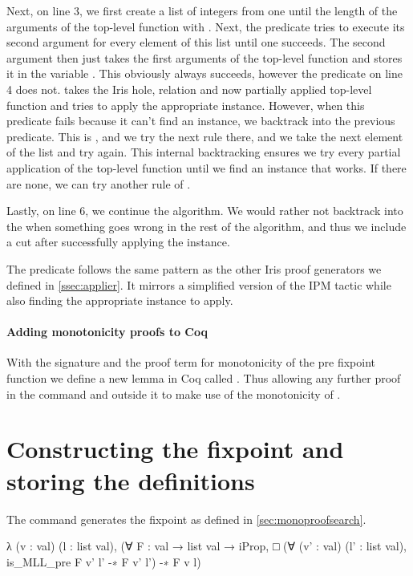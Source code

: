 \documentclass[thesis.tex]{subfiles}
\begin{document}
Next, on line 3, we first create a list of integers from one until the length of the arguments of the top-level function with . Next, the  predicate tries to execute its second argument for every element of this list until one succeeds. The second argument then just takes the first  arguments of the top-level function and stores it in the variable . This obviously always succeeds, however the predicate on line 4 does not.  takes the Iris hole, relation and now partially applied top-level function and tries to apply the appropriate  instance. However, when this predicate fails because it can't find an  instance, we backtrack into the previous predicate. This is , and we try the next rule there, and we take the next element of the list and try again. This internal backtracking ensures we try every partial application of the top-level function until we find an  instance that works. If there are none, we can try another rule of .

Lastly, on line 6, we continue the algorithm. We would rather not backtrack into the  when something goes wrong in the rest of the algorithm, and thus we include a cut after successfully applying the  instance.

The predicate  follows the same pattern as the other Iris proof generators we defined in \cref{ssec:applier}. It mirrors a simplified version of the IPM  tactic while also finding the appropriate  instance to apply.

\paragraph{Adding monotonicity proofs to Coq}
With the signature and the proof term for monotonicity of the pre fixpoint function we define a new lemma in Coq called . Thus allowing any further proof in the command and outside it to make use of the monotonicity of .

\section{Constructing the fixpoint and storing the definitions}\label{sec:constrfixpoint}
The command  generates the fixpoint as defined in \cref{sec:monoproofsearch}.
\begin{coqcode}
  λ (v : val) (l : list val),
    (∀ F : val → list val → iProp, 
      □ (∀ (v' : val) (l' : list val), 
            is_MLL_pre F v' l' -∗ F v' l') 
      -∗ F v l)
\end{coqcode}
\end{document}
